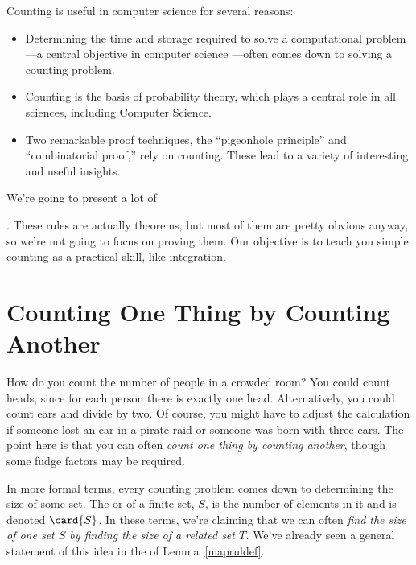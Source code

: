 Counting is useful in computer science for several reasons:

\begin{itemize}

\item Determining the time and storage required to solve a
computational problem ---a central objective in computer science
---often comes down to solving a counting problem.

\item Counting is the basis of probability theory, which plays a central
  role in all sciences, including Computer Science.

\item Two remarkable proof techniques, the ``pigeonhole principle'' and
  ``combinatorial proof,'' rely on counting.  These lead to a variety of
  interesting and useful insights.

\end{itemize}

We're going to present a lot of .  These rules are actually theorems, but most of them are
pretty obvious anyway, so we're not going to focus on proving them.  Our
objective is to teach you simple counting as a practical skill, like
integration.


\section{Counting One Thing by Counting Another}\label{bijection_counting_sec}

How do you count the number of people in a crowded room?  You could count
heads, since for each person there is exactly one head.  Alternatively,
you could count ears and divide by two.  Of course, you might have to
adjust the calculation if someone lost an ear in a pirate raid or someone
was born with three ears.  The point here is that you can often
\textit{count one thing by counting another}, though some fudge factors
may be required.  \iffalse This is a central theme of counting, from the
easiest problems to the hardest.\fi

In more formal terms, every counting problem comes down to determining the
size of some set.  The  or  of a finite set,
$S$, is the number of elements in it and is denoted  $\card{S}$.  In these terms, we're claiming that we
can often \textit{find the size of one set $S$ by finding the size of a
  related set $T$.}  We've already seen a general statement of this idea
in the  of Lemma~\ref{mapruldef}.

